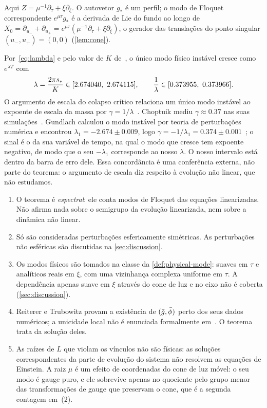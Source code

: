 Aqui $Z=\mu^{-1}\partial_\tau+\xi\partial_\xi$. O autovetor $g_*$ é um perfil; o modo de Floquet correspondente
$e^{\mu\tau}g_*$ é a derivada de Lie do fundo ao longo de $X_0=\partial_{u_-}+\partial_{u_+}=e^{\mu\tau}(\mu^{-1}\partial_\tau+\xi\partial_\xi)$,
o gerador das translações do ponto singular $(u_-,u_+)=(0,0)$ (\cref{lem:cone}).

\begin{remark}\label{rem:gamma}
Por~\eqref{eq:lambda} e pelo valor de $K$ de~\cite{RT2019}, o único modo físico instável cresce como
$e^{\lambda T}$ com
\[
  \lambda=\frac{2\pi\sphys}{K}\in[2.674040,\ 2.674115],\qquad
  \frac{1}{\lambda}\in[0.373955,\ 0.373966].
\]
O argumento de escala do colapso crítico relaciona um único modo instável ao expoente de escala da massa por
$\gamma=1/\lambda$~\cite{KoikeHaraAdachi1995,Gundlach1997}. Choptuik mediu $\gamma\approx0.37$ nas suas
simulações~\cite{Choptuik1993}. Gundlach calculou o modo instável por teoria de perturbações numérica e encontrou
$\lambda_1=-2.674\pm0.009$, logo $\gamma=-1/\lambda_1=0.374\pm0.001$~\cite{Gundlach1997}; o sinal é o da sua
variável de tempo, na qual o modo que cresce tem expoente negativo, de modo que o seu $-\lambda_1$ corresponde ao nosso
$\lambda$. O nosso intervalo está dentro da barra de erro dele. Essa concordância é uma conferência externa, não parte do
teorema: o argumento de escala diz respeito à evolução não linear, que não estudamos.
\end{remark}

\begin{remark}\label{rem:scope}
\begin{enumerate}[label=(\alph*),leftmargin=*]
\item O teorema é \emph{espectral}: ele conta modos de Floquet das equações linearizadas. Não afirma
  nada sobre o semigrupo da evolução linearizada, nem sobre a dinâmica não linear.
\item Só são consideradas perturbações esfericamente simétricas. As perturbações não esféricas são discutidas
  na \cref{sec:discussion}.
\item Os modos físicos são tomados na classe da \cref{def:physical-mode}: suaves em $\tau$ e analíticos
  reais em $\xi$, com uma vizinhança complexa uniforme em $\tau$. A dependência apenas suave em $\xi$
  através do cone de luz e no eixo não é coberta (\cref{sec:discussion}).
\item Reiterer e Trubowitz provam a existência de $(\bar g,\bar\phi)$ perto dos seus dados numéricos; a unicidade
  local não é enunciada formalmente em~\cite{RT2019}. O teorema trata da solução deles.
\item As raízes de $L$ que violam os vínculos não são físicas: as soluções correspondentes da
  parte de evolução do sistema não resolvem as equações de Einstein. A raiz $\mu$ é um efeito de coordenadas
  do cone de luz móvel: o seu modo é gauge puro, e ele sobrevive apenas no quociente pelo grupo menor
  das transformações de gauge que preservam o cone, que é a segunda contagem em~(2).
\end{enumerate}
\end{remark}

